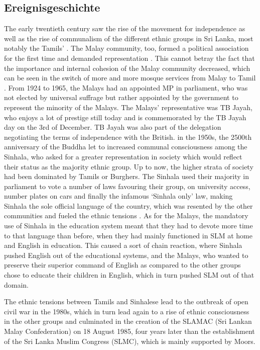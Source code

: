 \subsection{Ereignisgeschichte}\label{sec:slmbg:postreg:Ereignisgeschichte}
The early twentieth century saw the rise of the movement for independence as well as the rise of communalism of the different ethnic groups in Sri Lanka, most notably the Tamils' \citep{abc} . The Malay community, too, formed a political association for the first time and demanded representation \citep{abc} . This cannot betray the fact that the importance and internal cohesion of the Malay community decreased, which can be seen in the switch of more and more mosque services from Malay to Tamil  \citep{abc} .
From 1924 to 1965, the Malays had an appointed MP in parliament, who was not elected by universal suffrage but rather appointed by the government to represent the minority of the Malays. The Malays' representative was TB Jayah, who enjoys a lot of prestige still today and is commemorated by the TB Jayah day on the 3rd of December\kuckn. TB Jayah was also part of the delegation negotiating the terms of independence with the British. in the 1950s, the 2500th anniversary of the Buddha \kuckn let to increased communal consciousness among the Sinhala, who asked for a greater representation in society which would reflect their status as the majority ethnic group. Up to now, the higher strata of society had been dominated by Tamils or Burghers. The Sinhala used their majority in parliament to vote a number of laws favouring their group, on university access, number plates on cars and finally the infamous `Sinhala only' law, making Sinhala the sole official language of the country, which was resented by the other communities and fueled the ethnic tensions \citep{abc} . As for the Malays, the mandatory use of Sinhala in the education system meant that they had to devote more time to that language than before, when they had mainly functioned in SLM at home and English in education. This caused a sort of chain reaction, where Sinhala pushed English out of the educational systems, and the Malays, who wanted to preserve their superior command of English as compared to the other groups chose to educate their children in English, which in turn pushed SLM out of that domain.

The ethnic tensions between Tamils and Sinhalese lead to the outbreak of open civil war in the 1980s, which in turn lead again to a rise of ethnic consciousness in the other groups and culminated in the creation of the SLAMAC (Sri Lankan Malay Confederation) on 18 August 1985, four years later than the establishment of the Sri Lanka Muslim Congress (SLMC), which is mainly supported by Moors.

